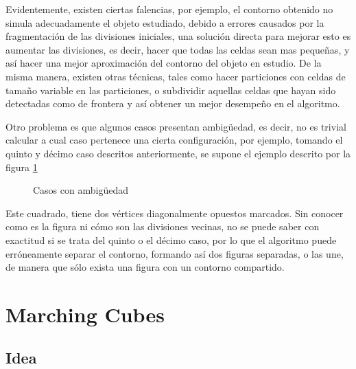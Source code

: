 Evidentemente, existen ciertas falencias, por ejemplo, el contorno obtenido no simula
adecuadamente el objeto estudiado, debido a errores causados por la fragmentación de las
divisiones iniciales, una solución directa para mejorar esto es aumentar las divisiones, es decir,
hacer que todas las celdas sean mas pequeñas, y así hacer una mejor aproximación del contorno
del objeto en estudio. De la misma manera, existen otras técnicas, tales como hacer particiones
con celdas de tamaño variable en las particiones, o subdividir aquellas celdas que hayan sido
detectadas como de frontera y así obtener un mejor desempeño en el algoritmo.

Otro problema es que algunos casos presentan ambigüedad, es decir, no es trivial calcular
a cual caso pertenece una cierta configuración, por ejemplo, tomando el quinto y décimo caso
descritos anteriormente, se supone el ejemplo descrito por la figura \ref{f:estadoDelArte:marchingSAmbEx}

\begin{figure}[hbp]
\centering
\caption{Casos con ambigüedad}
\label{f:estadoDelArte:marchingSAmbEx}
\end{figure}

Este cuadrado, tiene dos vértices diagonalmente opuestos marcados. Sin conocer como es
la figura ni cómo son las divisiones vecinas, no se puede saber con exactitud si se trata del quinto
o el décimo caso, por lo que el algoritmo puede erróneamente separar el contorno, formando así
dos figuras separadas, o las une, de manera que sólo exista una figura con un contorno
compartido.

\section{Marching Cubes}
\label{sec:marchingCubes}

\subsection{Idea}
\label{subsec:marchingCubes:idea}

